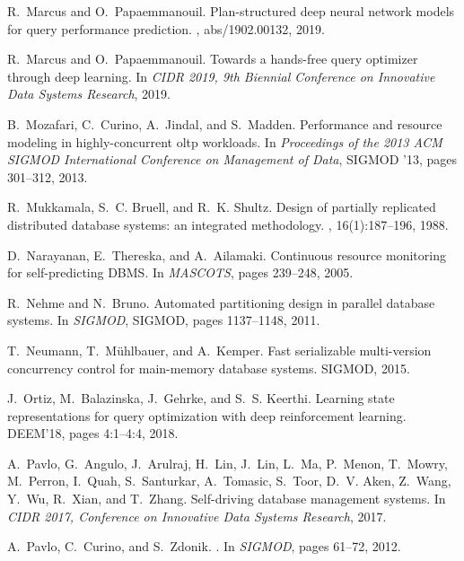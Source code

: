 \documentclass[11pt,times]{article}
\begin{document}
\begin{thebibliography}{10}
R.~Marcus and O.~Papaemmanouil.
\newblock Plan-structured deep neural network models for query performance
  prediction.
, abs/1902.00132, 2019.

R.~Marcus and O.~Papaemmanouil.
\newblock Towards a hands-free query optimizer through deep learning.
\newblock In {\em {CIDR} 2019, 9th Biennial Conference on Innovative Data
  Systems Research}, 2019.

B.~Mozafari, C.~Curino, A.~Jindal, and S.~Madden.
\newblock Performance and resource modeling in highly-concurrent oltp
  workloads.
\newblock In {\em Proceedings of the 2013 ACM SIGMOD International Conference
  on Management of Data}, SIGMOD '13, pages 301--312, 2013.

R.~Mukkamala, S.~C. Bruell, and R.~K. Shultz.
\newblock Design of partially replicated distributed database systems: an
  integrated methodology.
, 16(1):187--196, 1988.

D.~Narayanan, E.~Thereska, and A.~Ailamaki.
\newblock Continuous resource monitoring for self-predicting {DBMS}.
\newblock In {\em MASCOTS}, pages 239--248, 2005.

R.~Nehme and N.~Bruno.
\newblock Automated partitioning design in parallel database systems.
\newblock In {\em SIGMOD}, SIGMOD, pages 1137--1148, 2011.

T.~Neumann, T.~M{\"u}hlbauer, and A.~Kemper.
\newblock Fast serializable multi-version concurrency control for main-memory
  database systems.
\newblock SIGMOD, 2015.

J.~Ortiz, M.~Balazinska, J.~Gehrke, and S.~S. Keerthi.
\newblock Learning state representations for query optimization with deep
  reinforcement learning.
\newblock DEEM'18, pages 4:1--4:4, 2018.

A.~Pavlo, G.~Angulo, J.~Arulraj, H.~Lin, J.~Lin, L.~Ma, P.~Menon, T.~Mowry,
  M.~Perron, I.~Quah, S.~Santurkar, A.~Tomasic, S.~Toor, D.~V. Aken, Z.~Wang,
  Y.~Wu, R.~Xian, and T.~Zhang.
\newblock Self-driving database management systems.
\newblock In {\em {CIDR} 2017, Conference on Innovative Data Systems Research},
  2017.

A.~Pavlo, C.~Curino, and S.~Zdonik.
.
\newblock In {\em SIGMOD}, pages 61--72, 2012.


\end{thebibliography}
\end{document}
